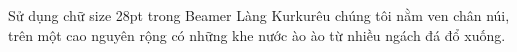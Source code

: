 \documentclass[28pt,a4paper]{beamer}
\begin{document}
\begin{frame}{Sử dụng chữ size 28pt trong Beamer}
\justifying
Làng Kurkurêu chúng tôi nằm ven chân núi, trên một cao nguyên rộng có những khe nước ào ào từ nhiều ngách đá đổ xuống.
\end{frame}
\end{document}
